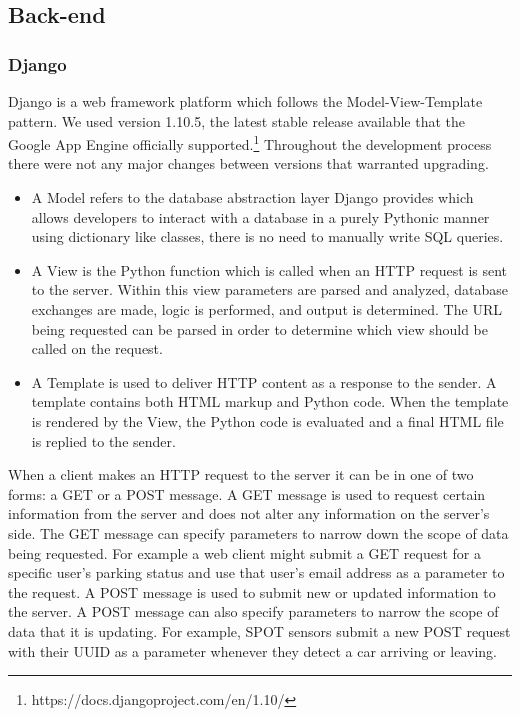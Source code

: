 \subsection{Back-end}

\subsubsection{Django}
Django is a web framework platform which follows the Model-View-Template pattern.
We used version 1.10.5, the latest stable release available that the Google App Engine officially supported.\footnote{https://docs.djangoproject.com/en/1.10/}
Throughout the development process there were not any major changes between versions that warranted upgrading.
\begin{itemize}

\item A Model refers to the database abstraction layer Django provides which allows developers to interact with a database in a purely Pythonic manner using dictionary like classes, there is no need to manually write SQL queries.
\item A View is the Python function which is called when an HTTP request is sent to the server.
Within this view parameters are parsed and analyzed, database exchanges are made, logic is performed, and output is determined.  The URL being requested can be parsed in order to determine which view should be called on the request.
\item A Template is used to deliver HTTP content as a response to the sender. 
A template contains both HTML markup and Python code. 
When the template is rendered by the View, the Python code is evaluated and a final HTML file is replied to the sender.
\end{itemize}
  

When a client makes an HTTP request to the server it can be in one of two forms: a GET or a POST message.
A GET message is used to request certain information from the server and does not alter any information on the server's side.
The GET message can specify parameters to narrow down the scope of data being requested.
For example a web client might submit a GET request for a specific user's parking status and use that user's email address as a parameter to the request.
A POST message is used to submit new or updated information to the server.
A POST message can also specify parameters to narrow the scope of data that it is updating.
For example, SPOT sensors submit a new POST request with their UUID as a parameter whenever they detect a car arriving or leaving.

